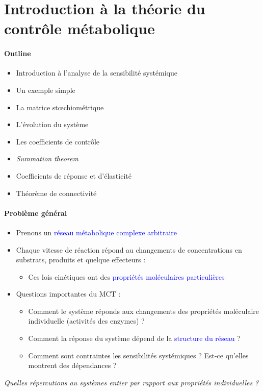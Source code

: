 \renewcommand{\labelitemi}{$\bullet$}
\renewcommand{\labelitemii}{$\cdot$}
\renewcommand{\labelitemiii}{$\diamond$}
\renewcommand{\labelitemiv}{$\ast$}

\section{Introduction à la théorie du contrôle métabolique}

\paragraph{Outline}
\begin{itemize}
	\item Introduction à l'analyse de la sensibilité systémique
	\item Un exemple simple
	\item La matrice stœchiométrique
	\item L'évolution du système
	\item Les coefficients de contrôle
	\item \textit{Summation theorem}
	\item Coefficients de réponse et d'élasticité
	\item Théorème de connectivité
\end{itemize}


\paragraph{Problème général}
\begin{itemize}
	\item Prenons un \textcolor{blue}{réseau métabolique complexe arbitraire}
	\item Chaque vitesse de réaction répond au changements de concentrations en substrats, produits et quelque effecteurs :
	\begin{itemize}
		\item Ces lois cinétiques ont des \textcolor{blue}{propriétés moléculaires particulières}
	\end{itemize}
	\item Questions importantes du MCT :
	\begin{itemize}
		\item Comment le système réponds aux changements des propriétés moléculaire individuelle (activités des enzymes) ?
		\item Comment la réponse du système dépend de la \textcolor{blue}{structure du réseau} ?
		\item Comment sont contraintes les sensibilités systémiques ? Est-ce qu'elles montrent des dépendances ?
	\end{itemize}
\end{itemize}
\textit{Quelles répercutions au systèmes entier par rapport aux propriétés individuelles ?}


